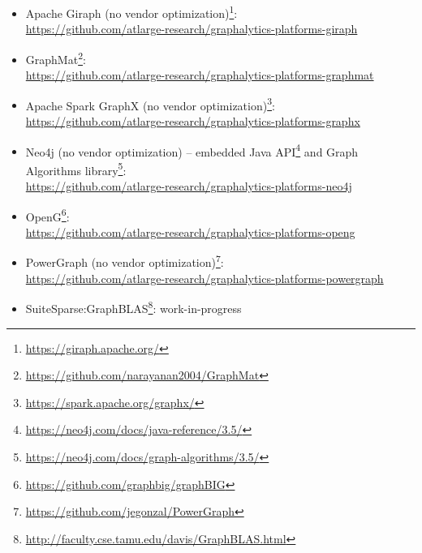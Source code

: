 \begin{itemize}
	\item Apache Giraph (no vendor optimization)\footnote{\url{https://giraph.apache.org/}}: \\\url{https://github.com/atlarge-research/graphalytics-platforms-giraph}
	\item GraphMat\footnote{\url{https://github.com/narayanan2004/GraphMat}}: \\\url{https://github.com/atlarge-research/graphalytics-platforms-graphmat}
	\item Apache Spark GraphX (no vendor optimization)\footnote{\url{https://spark.apache.org/graphx/}}: \\\url{https://github.com/atlarge-research/graphalytics-platforms-graphx}
	\item Neo4j (no vendor optimization) --
	embedded Java API\footnote{\url{https://neo4j.com/docs/java-reference/3.5/}} and
	Graph Algorithms library\footnote{\url{https://neo4j.com/docs/graph-algorithms/3.5/}}: \\\url{https://github.com/atlarge-research/graphalytics-platforms-neo4j}
	\item OpenG\footnote{\url{https://github.com/graphbig/graphBIG}}: \\\url{https://github.com/atlarge-research/graphalytics-platforms-openg}
	\item PowerGraph (no vendor optimization)\footnote{\url{https://github.com/jegonzal/PowerGraph}}: \\\url{https://github.com/atlarge-research/graphalytics-platforms-powergraph}
	\item SuiteSparse:GraphBLAS\footnote{\url{http://faculty.cse.tamu.edu/davis/GraphBLAS.html}}: work-in-progress
\end{itemize}

